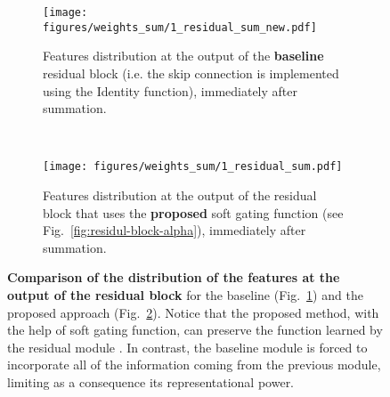 \documentclass[a4paper, 10pt, conference]{ieeeconf}      \usepackage{FG2020}
\begin{document}
\begin{figure}[!htbp]
    \centering
    \begin{subfigure}[t]{.23\textwidth}
    \centering
    \texttt{[image: figures/weights\_sum/1\_residual\_sum\_new.pdf]}
    \caption{Features distribution at the output of the \textbf{baseline} residual block (i.e. the skip connection is implemented using the Identity function), immediately after summation.}
    \label{fig:weights-distribution-sum-old}
    \end{subfigure}
    ~
    \begin{subfigure}[t]{.23\textwidth}
    \centering
    \texttt{[image: figures/weights\_sum/1\_residual\_sum.pdf]}
    \caption{Features distribution at the output of the residual block that uses the \textbf{proposed} soft gating function (see Fig.~\ref{fig:residul-block-alpha}), immediately after summation.}
    \label{fig:weights-distribution-sum-new}
    \end{subfigure}
    \caption{\textbf{Comparison of the distribution of the features at the output of the residual block} for the baseline (Fig.~\ref{fig:weights-distribution-sum-old}) and the proposed approach (Fig.~\ref{fig:weights-distribution-sum-new}). Notice that the proposed method, with the help of soft gating function, can preserve the function learned by the residual module . In contrast, the baseline module is forced to incorporate all of the information coming from the previous module, limiting as a consequence its representational power.}
    \label{fig:weights-distribution-after-sum}
\end{figure}
\end{document}
